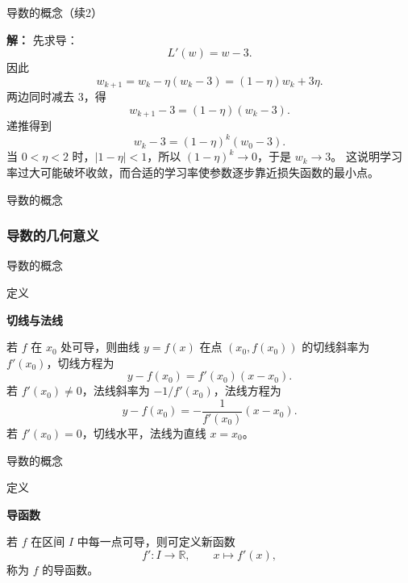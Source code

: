 \documentclass[aspectratio=169,10pt,fontset=fandol]{ctexbeamer}
\renewenvironment{solution}{\par\noindent\textbf{解：}\quad}{\par}
\newcommand{\RR}{\mathbb{R}}
\begin{document}
\begin{frame}[t,fragile]{导数的概念（续2）}
\footnotesize
{\footnotesize
\begin{application}[导数与梯度下降的基本思想]

	\begin{solution}
		先求导：
		\[
		L'(w)=w-3.
		\]
		因此
		\[
		w_{k+1}=w_k-\eta(w_k-3)=(1-\eta)w_k+3\eta.
		\]
		两边同时减去 $3$，得
		\[
		w_{k+1}-3=(1-\eta)(w_k-3).
		\]
		递推得到
		\[
		w_k-3=(1-\eta)^k(w_0-3).
		\]
		当 $0<\eta<2$ 时，$|1-\eta|<1$，所以 $(1-\eta)^k\to0$，于是 $w_k\to3$。 这说明学习率过大可能破坏收敛，而合适的学习率使参数逐步靠近损失函数的最小点。
	\end{solution}
	
\end{application}
}
\end{frame}
\begin{frame}[t,fragile]{导数的概念}
\normalsize
{\normalsize

\subsubsection*{导数的几何意义}


}
\end{frame}
\begin{frame}[t,fragile]{导数的概念}
\normalsize
\begin{block}{定义}
{\normalsize
\textbf{切线与法线}\par

若 $f$ 在 $x_0$ 处可导，则曲线 $y=f(x)$ 在点 $(x_0,f(x_0))$ 的切线斜率为 $f'(x_0)$，切线方程为
\[
y-f(x_0)=f'(x_0)(x-x_0).
\]
若 $f'(x_0)\neq0$，法线斜率为 $-1/f'(x_0)$，法线方程为
\[
y-f(x_0)=-\frac{1}{f'(x_0)}(x-x_0).
\]
若 $f'(x_0)=0$，切线水平，法线为直线 $x=x_0$。

}
\end{block}
\end{frame}
\begin{frame}[t,fragile]{导数的概念}
\normalsize
\begin{block}{定义}
{\normalsize
\textbf{导函数}\par

若 $f$ 在区间 $I$ 中每一点可导，则可定义新函数
\[
f':I\to\RR,\qquad x\mapsto f'(x),
\]
称为 $f$ 的导函数。

}
\end{block}
\end{frame}
\end{document}
